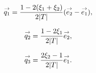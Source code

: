     \begin{minipage}{\textwidth}
      \begin{minipage}{0.329\textwidth}
          \begin{center}
            \begin{tikzpicture}[scale=1]
              
            \end{tikzpicture}
          \end{center}
          \begin{equation*}
            \vect{q_1}=\frac{1-2(\xi_1+\xi_2)}{2|T|}(\vect{e_2}-\vect{e_1}),
          \end{equation*}
      \end{minipage}
      \begin{minipage}{0.329\textwidth}
          \begin{center}
            \begin{tikzpicture}[scale=1]
              
            \end{tikzpicture}
             \begin{equation*}
              \vect{q_2}=\frac{1-2\xi_1}{2|T|}\vect{e_2},
            \end{equation*}
          \end{center}
      \end{minipage}
      \begin{minipage}{0.329\textwidth}
          \begin{center}
            \begin{tikzpicture}[scale=1]
              
            \end{tikzpicture}
            \begin{equation*}
              \vect{q_3}=\frac{2\xi_2-1}{2|T|}\vect{e_1}.
            \end{equation*}
          \end{center}
      \end{minipage}
      \label{fig:form_int:fon_base:q}
    \end{minipage}

